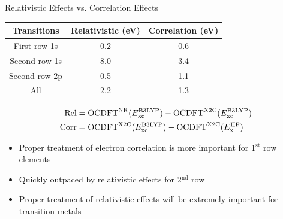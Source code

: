 \documentclass[t]{beamer}
\begin{document}
\begin{frame}{Relativistic Effects vs. Correlation Effects}
\begin{table}[t!]
\begin{tabular}{ccc}
\toprule
Transitions & Relativistic (eV) & Correlation (eV) \\
\midrule
First row 1s & 0.2 & 0.6 \\
Second row 1s & 8.0 & 3.4 \\
Second row 2p & 0.5 & 1.1 \\
All & 2.2 & 1.3 \\
\bottomrule
\end{tabular}
\label{table:CorrRel}
\end{table}
\begin{align}
\text{Rel} &= \text{OCDFT}^{\text{NR}}(E^{\text{B3LYP}}_{\text{xc}}) - \text{OCDFT}^{\text{X2C}}(E^{\text{B3LYP}}_{\rm xc}) \\
\text{Corr} &= \text{OCDFT}^{\text{X2C}}(E^{\text{B3LYP}}_{\text{xc}}) - \text{OCDFT}^{\text{X2C}}(E^{\text{HF}}_{\text{x}})
\end{align}
\begin{itemize}
\item Proper treatment of electron correlation is more important for 1$^{\text{st}}$ row elements
\item Quickly outpaced by relativistic effects for 2$^{\text{nd}}$ row
\item Proper treatment of relativistic effects will be extremely important for transition metals
\end{itemize}
\end{frame}
\end{document}
